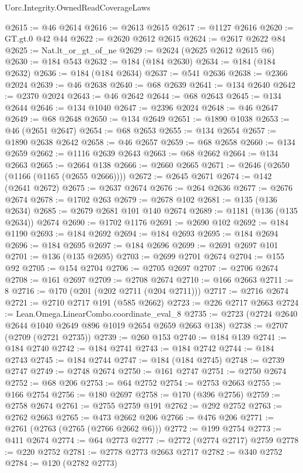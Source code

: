 \begin{lexlean}{Uorc.Integrity.OwnedReadCoverageLaws}
\begin{coremodule}
@2615 := @46 @2614
@2616 := @2613 @2615
@2617 := @1127 @2616
@2620 := GT.gt.{0} @42 @44
@2622 := @2620 @2612 @2615
@2624 := @2617 @2622 @84
@2625 := Nat.lt_or_gt_of_ne
@2629 := @2624 (@2625 @2612 @2615 @6)
@2630 := @184 @543
@2632 := @184 (@184 @2630)
@2634 := @184 (@184 @2632)
@2636 := @184 (@184 @2634)
@2637 := @541 @2636
@2638 := @2366 @2024
@2639 := @46 @2638
@2640 := @68 @2639
@2641 := @134 @2640
@2642 := @2370 @2024
@2643 := @46 @2642
@2644 := @68 @2643
@2645 := @134 @2644
@2646 := @134 @1040
@2647 := @2396 @2024
@2648 := @46 @2647
@2649 := @68 @2648
@2650 := @134 @2649
@2651 := @1890 @1038
@2653 := @46 (@2651 @2647)
@2654 := @68 @2653
@2655 := @134 @2654
@2657 := @1890 @2638 @2642
@2658 := @46 @2657
@2659 := @68 @2658
@2660 := @134 @2659
@2662 := @1116 @2639 @2643
@2663 := @68 @2662
@2664 := @134 @2663
@2665 := @2664 @138
@2666 := @2660 @2665
@2671 := @2646 (@2650 (@1166 (@1165 (@2655 @2666))))
@2672 := @2645 @2671
@2674 := @142 (@2641 @2672)
@2675 := @2637 @2674
@2676 := @264 @2636
@2677 := @2676 @2674
@2678 := @1702 @263
@2679 := @2678 @102
@2681 := @135 (@136 @2634)
@2685 := @2679 @2681 @101 @140 @2674
@2689 := @1181 (@136 (@135 @2634)) @2674
@2690 := @1702 @1176
@2691 := @2690 @102
@2692 := @184 @1190
@2693 := @184 @2692
@2694 := @184 @2693
@2695 := @184 @2694
@2696 := @184 @2695
@2697 := @184 @2696
@2699 := @2691 @2697 @101
@2701 := @136 (@135 @2695)
@2703 := @2699 @2701 @2674
@2704 := @155 @92
@2705 := @154 @2704
@2706 := @2705 @2697
@2707 := @2706 @2674
@2708 := @161 @2697
@2709 := @2708 @2674
@2710 := @166 @2663
@2711 := 8
@2716 := @170 (@201 (@202 @2711 (@204 @2711)))
@2717 := @2716 @2674
@2721 := @2710 @2717 @191 (@585 @2662)
@2723 := @226 @2717 @2663
@2724 := Lean.Omega.LinearCombo.coordinate_eval_8
@2735 := @2723 (@2724 @2640 @2644 @1040 @2649 @896 @1019 @2654 @2659 @2663 @138)
@2738 := @2707 (@2709 (@2721 @2735))
@2739 := @260 @153
@2740 := @184 @139
@2741 := @184 @2740
@2742 := @184 @2741
@2743 := @184 @2742
@2744 := @184 @2743
@2745 := @184 @2744
@2747 := @184 (@184 @2745)
@2748 := @2739 @2747
@2749 := @2748 @2674
@2750 := @161 @2747
@2751 := @2750 @2674
@2752 := @68 @206
@2753 := @64 @2752
@2754 := @2753 @2663
@2755 := @166 @2754
@2756 := @180 @2697
@2758 := @170 (@396 @2756)
@2759 := @2758 @2674
@2761 := @2755 @2759 @191
@2762 := @292 @2752
@2763 := @2762 @2663
@2765 := @473 @2662 @206
@2766 := @476 @206
@2771 := @2761 (@2763 (@2765 (@2766 @2662 @6)))
@2772 := @199 @2754
@2773 := @411 @2674
@2774 := @64 @2773
@2777 := @2772 (@2774 @2717) @2759
@2778 := @220 @2752
@2781 := @2778 @2773 @2663 @2717
@2782 := @340 @2752
@2784 := @120 (@2782 @2773)

\end{coremodule}
\end{lexlean}
